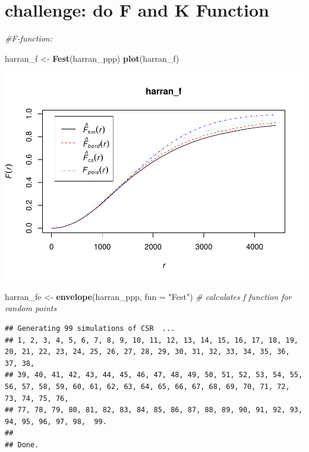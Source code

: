 \documentclass[]{article}
\newenvironment{Shaded}{\begin{snugshade}}{\end{snugshade}}
\newcommand{\KeywordTok}[1]{\textcolor[rgb]{0.13,0.29,0.53}{\textbf{{#1}}}}
\newcommand{\DataTypeTok}[1]{\textcolor[rgb]{0.13,0.29,0.53}{{#1}}}
\newcommand{\StringTok}[1]{\textcolor[rgb]{0.31,0.60,0.02}{{#1}}}
\newcommand{\CommentTok}[1]{\textcolor[rgb]{0.56,0.35,0.01}{\textit{{#1}}}}
\newcommand{\NormalTok}[1]{{#1}}
\begin{document}
\section{challenge: do F and K
Function}\label{challenge-do-f-and-k-function}

\begin{Shaded}
\begin{Highlighting}[]
\CommentTok{#F-function:}

\NormalTok{harran_f <-}\StringTok{ }\KeywordTok{Fest}\NormalTok{(harran_ppp)}
\KeywordTok{plot}\NormalTok{(harran_f)}
\end{Highlighting}
\end{Shaded}

\includegraphics{HarranPlain_files/figure-latex/unnamed-chunk-10-1.pdf}

\begin{Shaded}
\begin{Highlighting}[]
\NormalTok{harran_fe <-}\StringTok{ }\KeywordTok{envelope}\NormalTok{(harran_ppp, }\DataTypeTok{fun =} \StringTok{"Fest"}\NormalTok{) }\CommentTok{# calculates f function for random points}
\end{Highlighting}
\end{Shaded}

\begin{verbatim}
## Generating 99 simulations of CSR  ...
## 1, 2, 3, 4, 5, 6, 7, 8, 9, 10, 11, 12, 13, 14, 15, 16, 17, 18, 19, 20, 21, 22, 23, 24, 25, 26, 27, 28, 29, 30, 31, 32, 33, 34, 35, 36, 37, 38,
## 39, 40, 41, 42, 43, 44, 45, 46, 47, 48, 49, 50, 51, 52, 53, 54, 55, 56, 57, 58, 59, 60, 61, 62, 63, 64, 65, 66, 67, 68, 69, 70, 71, 72, 73, 74, 75, 76,
## 77, 78, 79, 80, 81, 82, 83, 84, 85, 86, 87, 88, 89, 90, 91, 92, 93, 94, 95, 96, 97, 98,  99.
## 
## Done.
\end{verbatim}
\end{document}
